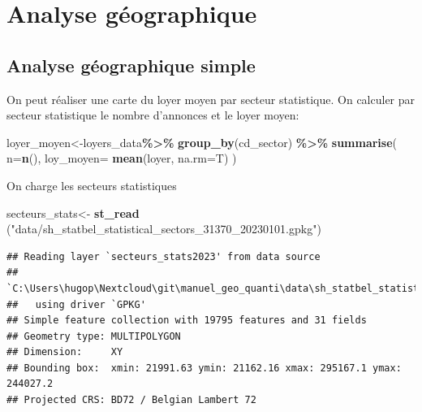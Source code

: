 \documentclass[
]{book}
\newenvironment{Shaded}{\begin{snugshade}}{\end{snugshade}}
\newcommand{\AttributeTok}[1]{\textcolor[rgb]{0.13,0.29,0.53}{#1}}
\newcommand{\FunctionTok}[1]{\textcolor[rgb]{0.13,0.29,0.53}{\textbf{#1}}}
\newcommand{\NormalTok}[1]{#1}
\newcommand{\OtherTok}[1]{\textcolor[rgb]{0.56,0.35,0.01}{#1}}
\newcommand{\SpecialCharTok}[1]{\textcolor[rgb]{0.81,0.36,0.00}{\textbf{#1}}}
\newcommand{\StringTok}[1]{\textcolor[rgb]{0.31,0.60,0.02}{#1}}
\begin{document}
\hypertarget{analyse-guxe9ographique}{%
\section{Analyse géographique}\label{analyse-guxe9ographique}}

\hypertarget{analyse-guxe9ographique-simple}{%
\subsection{Analyse géographique simple}\label{analyse-guxe9ographique-simple}}

On peut réaliser une carte du loyer moyen par secteur statistique. On
calculer par secteur statistique le nombre d'annonces et le loyer moyen:

\begin{Shaded}
\begin{Highlighting}[]
\NormalTok{loyer\_moyen}\OtherTok{\textless{}{-}}\NormalTok{loyers\_data}\SpecialCharTok{\%\textgreater{}\%}
  \FunctionTok{group\_by}\NormalTok{(cd\_sector) }\SpecialCharTok{\%\textgreater{}\%}
  \FunctionTok{summarise}\NormalTok{(}
    \AttributeTok{n=}\FunctionTok{n}\NormalTok{(),}
    \AttributeTok{loy\_moyen=} \FunctionTok{mean}\NormalTok{(loyer, }\AttributeTok{na.rm=}\NormalTok{T)}
\NormalTok{  )}
\end{Highlighting}
\end{Shaded}

On charge les secteurs statistiques

\begin{Shaded}
\begin{Highlighting}[]
\NormalTok{secteurs\_stats}\OtherTok{\textless{}{-}} \FunctionTok{st\_read}\NormalTok{ (}\StringTok{"data/sh\_statbel\_statistical\_sectors\_31370\_20230101.gpkg"}\NormalTok{)}
\end{Highlighting}
\end{Shaded}

\begin{verbatim}
## Reading layer `secteurs_stats2023' from data source 
##   `C:\Users\hugop\Nextcloud\git\manuel_geo_quanti\data\sh_statbel_statistical_sectors_31370_20230101.gpkg' 
##   using driver `GPKG'
## Simple feature collection with 19795 features and 31 fields
## Geometry type: MULTIPOLYGON
## Dimension:     XY
## Bounding box:  xmin: 21991.63 ymin: 21162.16 xmax: 295167.1 ymax: 244027.2
## Projected CRS: BD72 / Belgian Lambert 72
\end{verbatim}
\end{document}
